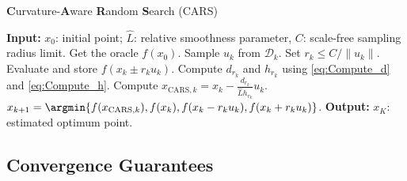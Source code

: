 \begin{algorithm}[H]
    \caption{\textbf{C}urvature-\textbf{A}ware \textbf{R}andom \textbf{S}earch (CARS)}
    \label{alg:CARS}
    \begin{algorithmic}[1]
        \State \textbf{Input:} $x_0$: initial point; $\hat{L}$: relative smoothness parameter,
        $C$: scale-free sampling radius limit.
        \State Get the oracle $f(x_0)$.
        \State Sample $u_k$ from $\mathcal{D}_k$.
        \State Set $r_k \leq C/\|u_k\|$.
        \State Evaluate and store $f(x_{k} \pm r_k u_k)$.
        \State Compute $d_{r_k}$ and $h_{r_k}$ using \eqref{eq:Compute_d} and \eqref{eq:Compute_h}.
        \State Compute $x_{\textrm{CARS}, k} = x_{k} - \frac{d_{r_k}}{\hat{L}h_{r_k}}u_k$.
        \State $x_{k+1} = \argmin\{f(x_{\textrm{CARS}, k}),f(x_k), f(x_{k} - r_k u_k), f(x_{k} + r_k u_k) \}$.
        \EndFor
        \State \textbf{Output:} $x_K$: estimated optimum point.
    \end{algorithmic}
\end{algorithm}

\subsection{Convergence Guarantees}\label{section:convergence of CARS}

